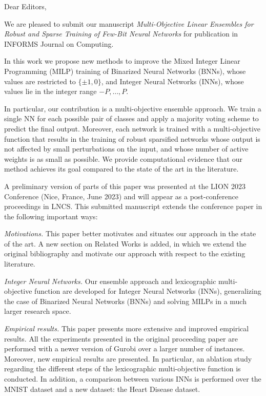 \documentclass{letter}
\begin{document}
\begin{letter}{}
%
\opening{Dear Editors,}
\bigskip

We are pleased to submit our manuscript \emph{Multi-Objective Linear Ensembles for Robust and Sparse Training of Few-Bit Neural Networks} for publication in INFORMS Journal on Computing.

In this work we propose new methods to improve the Mixed Integer Linear Programming (MILP) training of Binarized Neural Networks (BNNs), whose values are restricted to $\{\pm 1, 0\}$, and Integer Neural Networks (INNs), whose values lie in the integer range $-P, \dots, P$.

In particular, our contribution is a multi-objective ensemble approach.
%
We train a single NN for each possible pair of classes and apply a majority voting scheme to predict the final output. Moreover, each network is trained with a multi-objective function that results in the training of robust sparsified networks whose output is not affected by
small perturbations on the input, and whose number of active weights is as small as possible.
%
We provide computational evidence that our method achieves its goal compared to the state of the art in the literature.

A preliminary version of parts of this paper was presented at the LION 2023 Conference (Nice, France, June 2023) and will appear as a post-conference proceedings in LNCS. This submitted manuscript extends the conference paper in the following important ways:

\textit{Motivations.}
This paper better motivates and situates our approach in the state of the art. A new section on Related Works is added, in which we extend the original bibliography and motivate our approach with respect to the existing literature.

\textit{Integer Neural Networks.}
Our ensemble approach and lexicographic multi-objective function are developed for Integer Neural Networks (INNs), generalizing the case of Binarized Neural Networks (BNNs) and solving MILPs in a much larger research space.

\textit{Empirical results.}
This paper presents more extensive and improved empirical results. All the experiments presented in the original proceeding paper are performed with a newer version of Gurobi over a larger number of instances. Moreover, new empirical results are presented. In particular, an ablation study regarding the different steps of the lexicographic multi-objective function is conducted. In addition, a comparison between various INNs is performed over the MNIST dataset and a new dataset: the Heart Disease dataset.


\end{letter}
\end{document}
